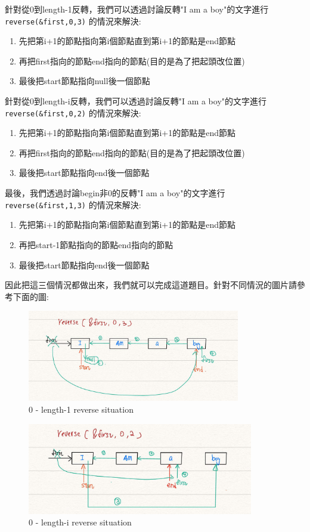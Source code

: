 \documentclass{article}
\begin{document}
		針對從0到length-1反轉，我們可以透過討論反轉"I am a boy"的文字進行\texttt{reverse(\&first,0,3)}
		的情況來解決:

		\begin{enumerate}
			\item 先把第i+1的節點指向第i個節點直到第i+1的節點是end節點
			\item 再把first指向的節點end指向的節點(目的是為了把起頭改位置)
			\item 最後把start節點指向null後一個節點
		\end{enumerate}


		針對從0到length-i反轉，我們可以透過討論反轉"I am a boy"的文字進行\texttt{reverse(\&first,0,2)}
		的情況來解決:

		\begin{enumerate}
			\item 先把第i+1的節點指向第i個節點直到第i+1的節點是end節點
			\item 再把first指向的節點end指向的節點(目的是為了把起頭改位置)
			\item 最後把start節點指向end後一個節點
		\end{enumerate}

		最後，我們透過討論begin非0的反轉"I am a boy"的文字進行\texttt{reverse(\&first,1,3)}
		的情況來解決:
		\begin{enumerate}
			\item 先把第i+1的節點指向第i個節點直到第i+1的節點是end節點
			\item 再把start-1節點指向的節點end指向的節點
			\item 最後把start節點指向end後一個節點
		\end{enumerate}
		\pagebreak
		因此把這三個情況都做出來，我們就可以完成這道題目。針對不同情況的圖片請參考下面的圖:
		\begin{figure}[h]
			\centering
			\includegraphics[height=4cm]{figure2.jpg}
			\caption{0 - length-1 reverse situation}
			\label{fig:example1}
		\end{figure}
		
		\begin{figure}[h]
			\centering
			\includegraphics[height=4cm]{figure1.jpg}
			\caption{0 - length-i reverse situation}
			\label{fig:example2}
		\end{figure}
		
\end{document}
